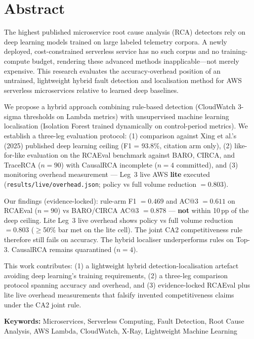 \chapter*{Abstract}

The highest published microservice root cause analysis (RCA) detectors rely on deep learning models trained on large labeled telemetry corpora. A newly deployed, cost-constrained serverless service has no such corpus and no training-compute budget, rendering these advanced methods inapplicable—not merely expensive. This research evaluates the accuracy-overhead position of an untrained, lightweight hybrid fault detection and localisation method for AWS serverless microservices relative to learned deep baselines.

We propose a hybrid approach combining rule-based detection (CloudWatch 3-sigma thresholds on Lambda metrics) with unsupervised machine learning localisation (Isolation Forest trained dynamically on control-period metrics). We establish a three-leg evaluation protocol: (1) comparison against Xing et al.'s (2025) published deep learning ceiling (F1 = 93.8\%, citation arm only), (2) like-for-like evaluation on the RCAEval benchmark against BARO, CIRCA, and TraceRCA ($n{=}90$) with CausalRCA incomplete ($n{=}4$ committed), and (3) monitoring overhead measurement --- Leg~3 live AWS \textbf{lite} executed (\texttt{results/live/overhead.json}; policy vs full volume reduction $=0.803$).

Our findings (evidence-locked): rule-arm F1 $=0.469$ and AC@3 $=0.611$ on RCAEval ($n{=}90$) vs BARO/CIRCA AC@3 $=0.878$ --- \textbf{not} within 10\,pp of the deep ceiling. Lite Leg~3 live overhead shows policy vs full volume reduction $=0.803$ ($\geq$50\% bar met on the lite cell). The joint CA2 competitiveness rule therefore still fails on accuracy. The hybrid localiser underperforms rules on Top-3. CausalRCA remains quarantined ($n{=}4$).

This work contributes: (1) a lightweight hybrid detection-localisation artefact avoiding deep learning's training requirements, (2) a three-leg comparison protocol spanning accuracy and overhead, and (3) evidence-locked RCAEval plus lite live overhead measurements that falsify invented competitiveness claims under the CA2 joint rule.

\textbf{Keywords:} Microservices, Serverless Computing, Fault Detection, Root Cause Analysis, AWS Lambda, CloudWatch, X-Ray, Lightweight Machine Learning
